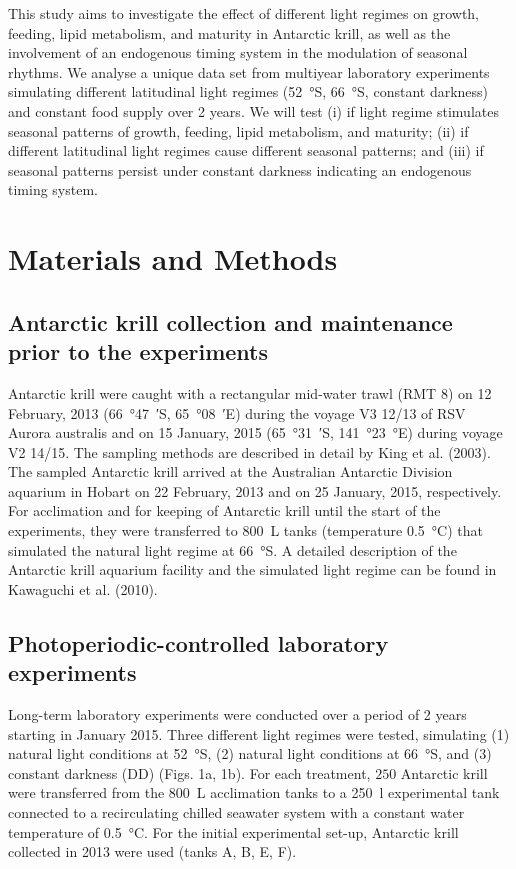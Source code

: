 This study aims to investigate the effect of different light regimes on growth,
feeding, lipid metabolism, and maturity in Antarctic krill, as well as the
involvement of an endogenous timing system in the modulation of seasonal
rhythms. We analyse a unique data set from multiyear laboratory experiments
simulating different latitudinal light regimes (\SI{52}{\degree}S,
\SI{66}{\degree}S, constant darkness) and constant food supply over 2 years. We
will test (i) if light regime stimulates seasonal patterns of growth, feeding,
lipid metabolism, and maturity; (ii) if different latitudinal light regimes
cause different seasonal patterns; and (iii) if seasonal patterns persist under
constant darkness indicating an endogenous timing system.

\section{Materials and Methods}

\subsection{Antarctic krill collection and maintenance prior to the experiments}

Antarctic krill were caught with a rectangular mid-water trawl (RMT 8) on 12
February, 2013 (\SI{66}{\degree}\SI{47}{\arcmin}S,
\SI{65}{\degree}\SI{08}{\arcmin}E) during the voyage V3 12/13 of RSV Aurora
australis and on 15 January, 2015 (\SI{65}{\degree}\SI{31}{\arcmin}S,
\SI{141}{\degree}\SI{23}{\degree}E) during voyage V2 14/15. The sampling
methods are described in detail by King et al. (2003). The sampled Antarctic
krill arrived at the Australian Antarctic Division aquarium in Hobart on 22
February, 2013 and on 25 January, 2015, respectively. For acclimation and for
keeping of Antarctic krill until the start of the experiments, they were
transferred to \SI{800}{\liter} tanks (temperature \SI{0.5}{\celsius}) that
simulated the natural light regime at \SI{66}{\degree}S. A detailed description
of the Antarctic krill aquarium facility and the simulated light regime can be
found in Kawaguchi et al. (2010). 

\subsection{Photoperiodic-controlled laboratory experiments} 

Long-term laboratory experiments were conducted over a period of 2 years
starting in January 2015. Three different light regimes were tested, simulating
(1) natural light conditions at \SI{52}{\degree}S, (2) natural light conditions
at \SI{66}{\degree}S, and (3) constant darkness (DD) (Figs. 1a, 1b). For each
treatment, $250$ Antarctic krill were transferred from the \SI{800}{\liter}
acclimation tanks to a \SI{250}{\litre} experimental tank connected to a
recirculating chilled seawater system with a constant water temperature of
\SI{0.5}{\celsius}. For the initial experimental set-up, Antarctic krill
collected in 2013 were used (tanks A, B, E, F). 

